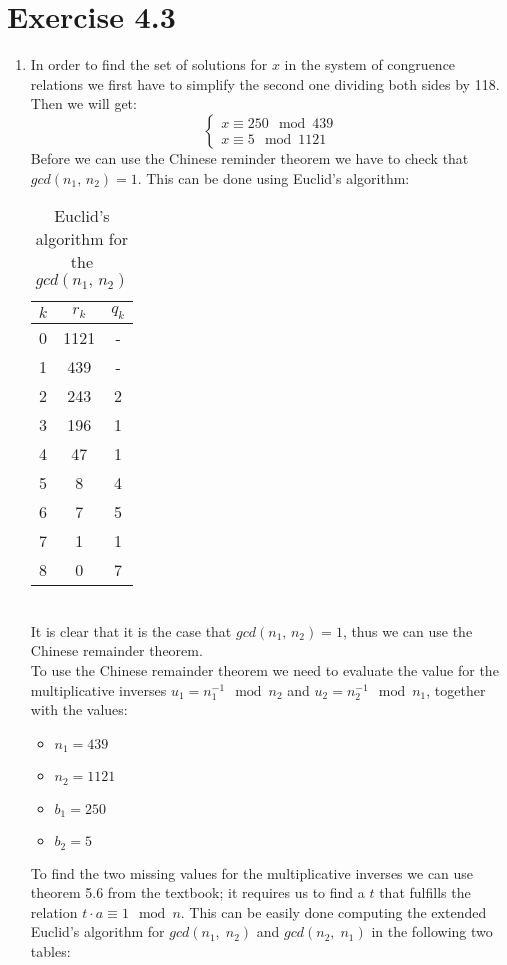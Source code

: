 \pagebreak
\section{Exercise 4.3}
\renewcommand{\labelenumi}{\alph{enumi})}
\begin{enumerate}
\item
In order to find the set of solutions for $x$ in the system of congruence relations we first have to simplify the second one dividing both sides by 118. Then we will get:
\[ \begin{cases}
x \equiv 250 \mod 439 \\
x \equiv 5 \mod 1121 
\end{cases} \]
Before we can use the Chinese reminder theorem we have to check that $ gcd(n_1,\, n_2) = 1$. This can be done using Euclid's algorithm: \\
\begin{table}[h!]
\centering
\begin{tabular}{|c||c|c|}
  \hline
$k$ & $r_k$ & $q_k$ \\
 \hline
 \hline
0 & 1121 & - \\
\hline
1 & 439 & - \\
\hline
2 & 243 & 2 \\
\hline
3 & 196 & 1 \\
\hline
4 & 47 & 1  \\
\hline
5 & 8 & 4 \\
\hline
6 & 7 & 5 \\
\hline
7 & 1 & 1 \\
\hline
8 & 0 & 7 \\
\hline
\end{tabular}
\caption{Euclid's algorithm for the $ gcd(n_1,\, n_2) $}
\label{Euc}
\end{table} \\
It is clear that it is the case that $ gcd(n_1,\, n_2) = 1 $, thus we can use the Chinese remainder theorem. \\
To use the Chinese remainder theorem we need to evaluate the value for the multiplicative inverses $ u_1 = n_1^{-1} \mod n_2 $ and $ u_2 = n_2^{-1} \mod n_1 $, together with the values:
\begin{itemize}
    \item $ n_1 = 439 $
    \item $ n_2 = 1121 $
    \item $ b_1 = 250 $
    \item $ b_2 = 5 $
\end{itemize}
To find the two missing values for the multiplicative inverses we can use theorem 5.6 from the textbook; it requires us to find a $t$ that fulfills the relation $ t \cdot a \equiv 1 \mod n $. This can be easily done computing the extended Euclid's algorithm for $ gcd(n_1,\;n_2) $ and $ gcd(n_2,\;n_1) $ in the following two tables: \\

\end{enumerate}

